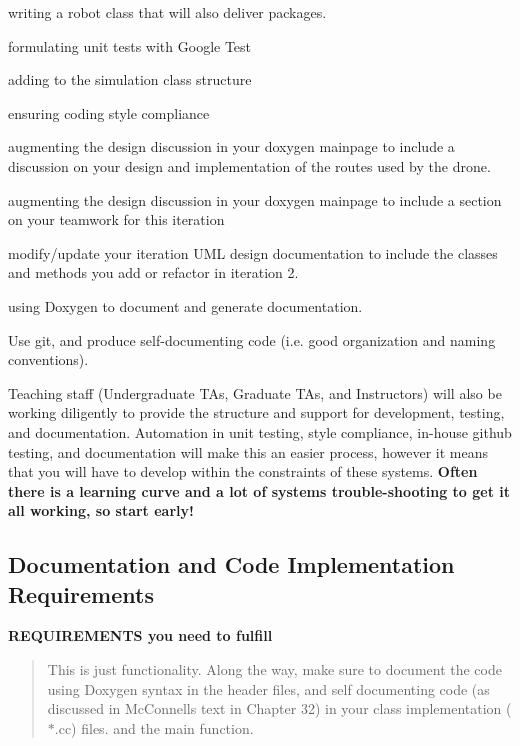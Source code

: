 \begin{DoxyItemize}
\item writing a robot class that will also deliver packages.
\item formulating unit tests with Google Test
\item adding to the simulation class structure
\item ensuring coding style compliance
\item augmenting the design discussion in your doxygen mainpage to include a discussion on your design and implementation of the routes used by the drone.
\item augmenting the design discussion in your doxygen mainpage to include a section on your teamwork for this iteration
\item modify/update your iteration U\+ML design documentation to include the classes and methods you add or refactor in iteration 2.
\item using Doxygen to document and generate documentation.
\item Use git, and produce self-\/documenting code (i.\+e. good organization and naming conventions).
\end{DoxyItemize}

Teaching staff (Undergraduate TA\textquotesingle{}s, Graduate TA\textquotesingle{}s, and Instructors) will also be working diligently to provide the structure and support for development, testing, and documentation. Automation in unit testing, style compliance, in-\/house github testing, and documentation will make this an easier process, however it means that you will have to develop within the constraints of these systems. {\bfseries Often there is a learning curve and a lot of systems trouble-\/shooting to get it all working, so start early!}

\subsection*{Documentation and Code Implementation Requirements}

{\bfseries R\+E\+Q\+U\+I\+R\+E\+M\+E\+N\+TS you need to fulfill}

\begin{quote}
This is just functionality. Along the way, make sure to document the code using Doxygen syntax in the header files, and self documenting code (as discussed in Mc\+Connell\textquotesingle{}s text in Chapter 32) in your class implementation ($\ast$.cc) files. and the main function. \end{quote}


